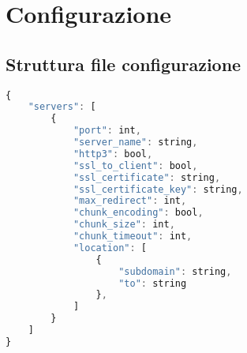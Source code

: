 \section{Configurazione}

\subsection{Struttura file configurazione}
\begin{lstlisting}[language=Javascript]
  {
    "servers": [
        {
            "port": int,
            "server_name": string,
            "http3": bool,
            "ssl_to_client": bool,
            "ssl_certificate": string,
            "ssl_certificate_key": string,
            "max_redirect": int,
            "chunk_encoding": bool,
            "chunk_size": int,
            "chunk_timeout": int,
            "location": [
                {
                    "subdomain": string,
                    "to": string
                },
            ]
        }
    ]
}
\end{lstlisting}


